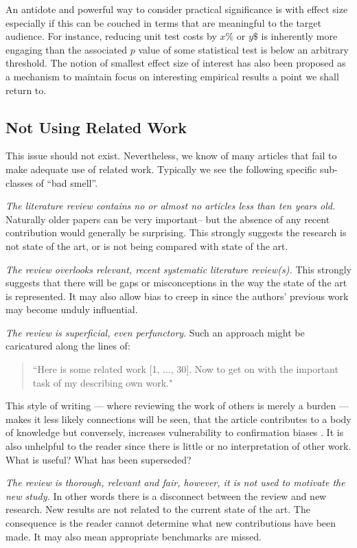 \documentclass[10pt]{elsarticle}
\newcommand{\RED}{\color{black}}
\newcommand{\BLACK}{\color{black}}
\begin{document}
An antidote and powerful way to consider practical significance is with effect size \cite{Elli10} especially if this can be couched in terms that are meaningful to the target audience.  For instance, reducing unit test costs by $x\%$ or $y\$ $ is inherently more engaging than the associated $p$ value of some statistical test is below an arbitrary threshold. The notion of smallest effect size of interest has also been proposed as a mechanism to maintain focus on interesting empirical results \cite{Lake17} a point we shall return to.


\subsection{Not Using Related Work}
This issue should not exist. Nevertheless, we know of many articles that fail to make adequate use of related work. Typically we see the following specific sub-classes of ``bad smell''.

 {\em The literature review contains no or almost no articles less than ten years old.}  \RED Naturally older papers can be very important-- but the absence of any recent contribution would generally be surprising. \BLACK This strongly suggests the research is not state of the art, or is not being compared with state of the art.

{\em The review overlooks relevant, recent systematic literature review(s).}  This strongly suggests that there will be gaps or misconceptions in the way the state of the art is represented.  It may also allow bias to creep in since the authors' previous work may become unduly influential.

{\em The review is superficial, even perfunctory}. Such an approach might be caricatured along the lines of: \begin{quote}
    ``Here is some related work [1, ..., 30].  Now to get on with the important task of my describing own work."
\end{quote}
This style of writing --- where reviewing the work of others is merely a burden --- makes it less likely connections will be seen, that the article contributes to a body of knowledge but conversely, increases vulnerability to confirmation biases \cite{Nick98}.  It is also unhelpful to the reader since there is little or no interpretation of other work.  What is useful?  What has been superseded?

{\em The review is thorough, relevant and fair, however, it is not used to motivate the new study. } In other words there is a disconnect between the review  and new research. New results are not related to the current state of the art.  The consequence is the reader cannot determine what new contributions have been made.  It may also mean appropriate benchmarks are missed.
\end{document}
